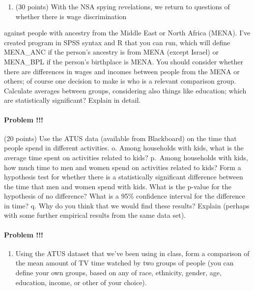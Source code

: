 \documentclass[]{article}
\providecommand{\tightlist}{%
  \setlength{\itemsep}{0pt}\setlength{\parskip}{0pt}}
\let\oldparagraph\paragraph
\renewcommand{\paragraph}[1]{\oldparagraph{#1}\mbox{}}
\begin{document}
\begin{enumerate}
\def\labelenumi{\arabic{enumi}.}
\setcounter{enumi}{10}
\tightlist
\item
  (30 points) With the NSA spying revelations, we return to questions of
  whether there is wage discrimination
\end{enumerate}

against people with ancestry from the Middle East or North Africa
(MENA). I've created program in SPSS syntax and R that you can run,
which will define MENA\_ANC if the person's ancestry is from MENA
(except Israel) or MENA\_BPL if the person's birthplace is MENA. You
should consider whether there are differences in wages and incomes
between people from the MENA or others; of course one decision to make
is who is a relevant comparison group. Calculate averages between
groups, considering also things like education; which are statistically
significant? Explain in detail.

\paragraph{Problem !!!}\label{problem-25}

(20 points) Use the ATUS data (available from Blackboard) on the time
that people spend in different activities. o. Among households with
kids, what is the average time spent on activities related to kids?
p.~Among households with kids, how much time to men and women spend on
activities related to kids? Form a hypothesis test for whether there is
a statistically significant difference between the time that men and
women spend with kids. What is the p-value for the hypothesis of no
difference? What is a 95\% confidence interval for the difference in
time? q. Why do you think that we would find these results? Explain
(perhaps with some further empirical results from the same data set).

\paragraph{Problem !!!}\label{problem-26}

\begin{enumerate}
\def\labelenumi{\arabic{enumi}.}
\setcounter{enumi}{63}
\tightlist
\item
  Using the ATUS dataset that we've been using in class, form a
  comparison of the mean amount of TV time watched by two groups of
  people (you can define your own groups, based on any of race,
  ethnicity, gender, age, education, income, or other of your choice).
\end{enumerate}
\end{document}
